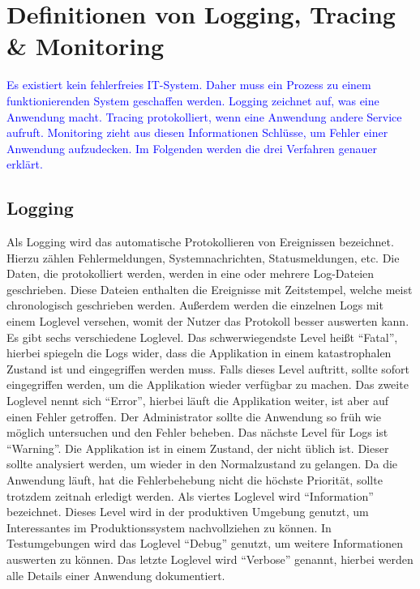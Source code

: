 \chapter{Definitionen von Logging, Tracing {\selectfont \&} Monitoring}\label{ch:definition-von-logging-tracing-&-monitoring}
\textcolor{blue}{
Es existiert kein fehlerfreies IT-System.
Daher muss ein Prozess zu einem funktionierenden System geschaffen werden.
Logging zeichnet auf, was eine Anwendung macht.
Tracing protokolliert, wenn eine Anwendung andere Service aufruft.
Monitoring zieht aus diesen Informationen Schlüsse, um Fehler einer Anwendung aufzudecken.
Im Folgenden werden die drei Verfahren genauer erklärt.
}

\section{Logging}\label{sec:logging}
Als Logging wird das automatische Protokollieren von Ereignissen bezeichnet.
Hierzu zählen Fehlermeldungen, Systemnachrichten, Statusmeldungen, etc.
Die Daten, die protokolliert werden, werden in eine oder mehrere Log-Dateien geschrieben.
Diese Dateien enthalten die Ereignisse mit Zeitstempel, welche meist chronologisch geschrieben werden.
Außerdem werden die einzelnen Logs mit einem Loglevel versehen, womit der Nutzer das Protokoll besser auswerten kann.
Es gibt sechs verschiedene Loglevel.
Das schwerwiegendste Level heißt \enquote{Fatal}, hierbei spiegeln die Logs wider, dass die Applikation in einem katastrophalen Zustand ist und eingegriffen werden muss.
Falls dieses Level auftritt, sollte sofort eingegriffen werden, um die Applikation wieder verfügbar zu machen.
Das zweite Loglevel nennt sich \enquote{Error}, hierbei läuft die Applikation weiter, ist aber auf einen Fehler getroffen.
Der Administrator sollte die Anwendung so früh wie möglich untersuchen und den Fehler beheben.
Das nächste Level für Logs ist \enquote{Warning}.
Die Applikation ist in einem Zustand, der nicht üblich ist.
Dieser sollte analysiert werden, um wieder in den Normalzustand zu gelangen.
Da die Anwendung läuft, hat die Fehlerbehebung nicht die höchste Priorität, sollte trotzdem zeitnah erledigt werden.
Als viertes Loglevel wird \enquote{Information} bezeichnet.
Dieses Level wird in der produktiven Umgebung genutzt, um Interessantes im Produktionssystem nachvollziehen zu können.
In Testumgebungen wird das Loglevel \enquote{Debug} genutzt, um weitere Informationen auswerten zu können.
Das letzte Loglevel wird \enquote{Verbose} genannt, hierbei werden alle Details einer Anwendung dokumentiert.
